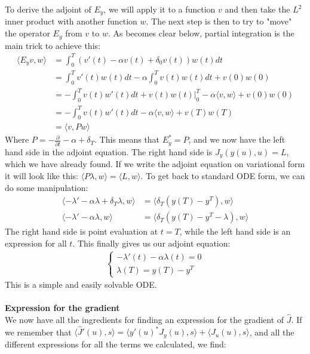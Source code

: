 \documentclass[11pt,a4paper]{report}
\begin{document}
To derive the adjoint of $E_y$, we will apply it to a function $v$ and then take the $L^2$ inner product with another function $w$. The next step is then to try to "move" the operator $E_y$ from $v$ to $w$. As becomes clear below, partial integration is the main trick to achieve this: 
\begin{align*}
\langle E_yv,w \rangle &=  \int_0^T(v'(t)-\alpha v(t)+\delta_0v(t))w(t)dt \\ &= \int_0^Tv'(t)w(t)dt -\alpha\int_0^Tv(t)w(t) dt +v(0)w(0) \\
& = -\int_0^Tv(t)w'(t)dt +v(t)w(t)|_0^T-\alpha\langle v,w\rangle +v(0)w(0) \\
&=-\int_0^Tv(t)w'(t)dt -\alpha\langle v,w\rangle +v(T)w(T) \\
&= \langle v,Pw \rangle
\end{align*} 
Where $P=-\frac{\partial}{\partial t} -\alpha + \delta_T$. This means that $E_y^* = P$, and we now have the left hand side in the adjoint equation. The right hand side is $J_y(y(u),u)=L$, which we have already found. If we write the  adjoint equation on variational form it will look like this: $\langle P\lambda,w\rangle = \langle L,w\rangle$. To get back to standard ODE form, we can do some manipulation: 
\begin{align*}
\langle -\lambda'-\alpha \lambda +\delta_T\lambda,w \rangle &= \langle \delta_T(y(T)-y^T),w\rangle \\
\langle -\lambda'-\alpha \lambda ,w \rangle &= \langle \delta_T(y(T)-y^T -\lambda),w\rangle
\end{align*}
The right hand side is point evaluation at $t=T$, while the left hand side is an expression for all $t$. This finally gives us our adjoint equation: 
\begin{align}
   \left\{
     \begin{array}{lr}
       -\lambda'(t) -\alpha\lambda(t)=0  \\
       \lambda(T) = y(T)-y^T
     \end{array}
   \right.
\end{align}
This is a simple and easily solvable ODE.
\\
\\
\textbf{Expression for the gradient}
\\
We now have all the ingredients for finding an expression for the gradient of $\hat{J}$. If we remember that $\langle\hat{J}'(u),s\rangle=\langle y'(u)^*J_y(u),s\rangle +\langle J_u(u),s\rangle$, and all the different expressions for all the terms we calculated, we find:
\end{document}
